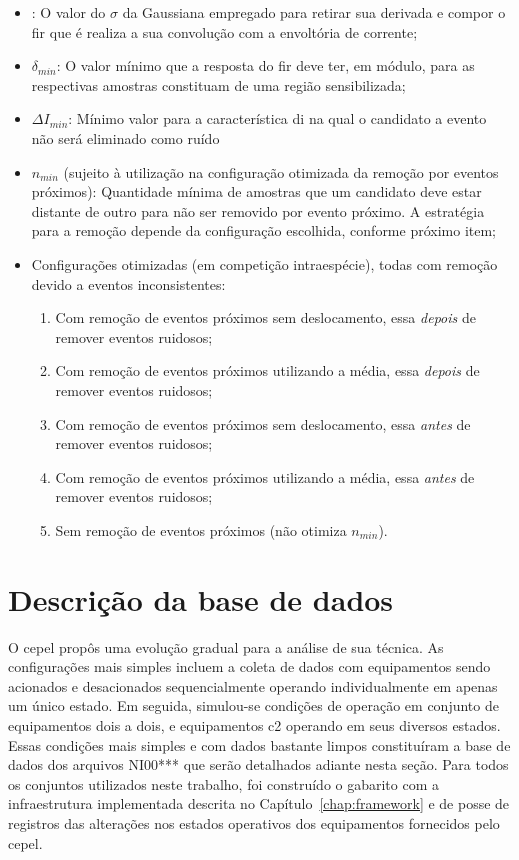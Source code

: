 \begin{itemize}
\item {}: O valor do
$\sigma$ da Gaussiana empregado para retirar sua derivada e compor o
\acs{fir} que é realiza a sua convolução com a envoltória de corrente;
\item $\delta_{min}$: O valor mínimo que a resposta do \acs{fir} deve
ter, em módulo, para as respectivas amostras constituam de uma região
sensibilizada;
\item $\Delta{I}_{min}$: Mínimo valor para a característica \acs{di} na
qual o candidato a evento não será eliminado como ruído 
\item $n_{min}$ (sujeito à utilização na configuração otimizada da
remoção por eventos próximos): Quantidade mínima de amostras que um
candidato deve estar distante de outro para não ser removido por evento
próximo. A estratégia para a remoção depende da configuração
escolhida, conforme próximo item; 
\item Configurações otimizadas (em competição intraespécie), todas com
remoção devido a eventos inconsistentes:
\begin{enumerate}[label={Espécie} (\Roman*) -,ref=(\Roman*),align=left]
\item\label{item:esp1} Com remoção de eventos próximos sem
deslocamento, essa \emph{depois} de remover eventos ruidosos;
\item\label{item:esp2} Com remoção de eventos próximos utilizando a
média, essa \emph{depois} de remover eventos ruidosos;
\item\label{item:esp3} Com remoção de eventos próximos sem
deslocamento, essa \emph{antes} de remover eventos ruidosos;
\item\label{item:esp4} Com remoção de eventos próximos utilizando a
média, essa \emph{antes} de remover eventos ruidosos;
\item\label{item:esp5} Sem remoção de eventos próximos (não otimiza
$n_{min}$). 
\end{enumerate}
\end{itemize}


\section{Descrição da base de dados}
\label{sec:base_de_dados}

O \acs{cepel} propôs uma evolução gradual para a análise de sua
técnica. As configurações mais simples incluem a coleta de dados com
equipamentos sendo acionados e desacionados sequencialmente operando
individualmente em apenas um único estado. Em seguida, simulou-se
condições de operação em conjunto de equipamentos dois a dois, e
equipamentos \acs{c2} operando em seus diversos estados. Essas
condições mais simples e com dados bastante limpos constituíram a base
de dados dos arquivos NI00*** que serão detalhados adiante nesta
seção. Para todos os conjuntos utilizados neste trabalho, foi
construído o gabarito com a infraestrutura implementada descrita no
Capítulo~\ref{chap:framework} e de posse de registros das alterações
nos estados operativos dos equipamentos fornecidos pelo \acs{cepel}.

